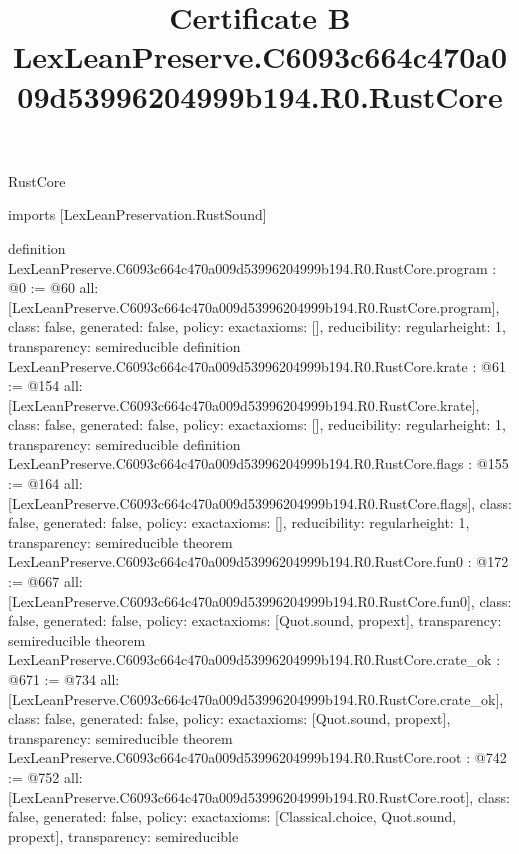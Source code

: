 \begin{lexlean}{RustCore}
\title{Certificate B LexLeanPreserve.C6093c664c470a009d53996204999b194.R0.RustCore}
\begin{coremodule}
imports [LexLeanPreservation.RustSound]

definition LexLeanPreserve.C6093c664c470a009d53996204999b194.R0.RustCore.program : @0 := @60 {
  all: [LexLeanPreserve.C6093c664c470a009d53996204999b194.R0.RustCore.program],
  class: false,
  generated: false,
  policy: exact{axioms: []},
  reducibility: regular{height: 1},
  transparency: semireducible
}
definition LexLeanPreserve.C6093c664c470a009d53996204999b194.R0.RustCore.krate : @61 := @154 {
  all: [LexLeanPreserve.C6093c664c470a009d53996204999b194.R0.RustCore.krate],
  class: false,
  generated: false,
  policy: exact{axioms: []},
  reducibility: regular{height: 1},
  transparency: semireducible
}
definition LexLeanPreserve.C6093c664c470a009d53996204999b194.R0.RustCore.flags : @155 := @164 {
  all: [LexLeanPreserve.C6093c664c470a009d53996204999b194.R0.RustCore.flags],
  class: false,
  generated: false,
  policy: exact{axioms: []},
  reducibility: regular{height: 1},
  transparency: semireducible
}
theorem LexLeanPreserve.C6093c664c470a009d53996204999b194.R0.RustCore.fun0 : @172 := @667 {
  all: [LexLeanPreserve.C6093c664c470a009d53996204999b194.R0.RustCore.fun0],
  class: false,
  generated: false,
  policy: exact{axioms: [Quot.sound, propext]},
  transparency: semireducible
}
theorem LexLeanPreserve.C6093c664c470a009d53996204999b194.R0.RustCore.crate_ok : @671 := @734 {
  all: [LexLeanPreserve.C6093c664c470a009d53996204999b194.R0.RustCore.crate_ok],
  class: false,
  generated: false,
  policy: exact{axioms: [Quot.sound, propext]},
  transparency: semireducible
}
theorem LexLeanPreserve.C6093c664c470a009d53996204999b194.R0.RustCore.root : @742 := @752 {
  all: [LexLeanPreserve.C6093c664c470a009d53996204999b194.R0.RustCore.root],
  class: false,
  generated: false,
  policy: exact{axioms: [Classical.choice, Quot.sound, propext]},
  transparency: semireducible
}


\end{coremodule}
\end{lexlean}
